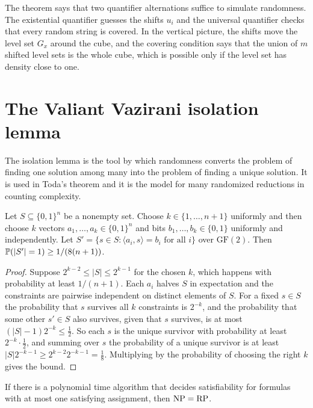 The theorem says that two quantifier alternations suffice to simulate randomness. The existential quantifier guesses the shifts $u_i$ and the universal quantifier checks that every random string is covered. In the vertical picture, the shifts move the level set $G_x$ around the cube, and the covering condition says that the union of $m$ shifted level sets is the whole cube, which is possible only if the level set has density close to one.

\section{The Valiant Vazirani isolation lemma}

The isolation lemma is the tool by which randomness converts the problem of finding one solution among many into the problem of finding a unique solution. It is used in Toda's theorem and it is the model for many randomized reductions in counting complexity.

\begin{lemma}
Let $S \subseteq \{0,1\}^n$ be a nonempty set. Choose $k \in \{1, \dots, n+1\}$ uniformly and then choose $k$ vectors $a_1, \dots, a_k \in \{0,1\}^n$ and bits $b_1, \dots, b_k \in \{0,1\}$ uniformly and independently. Let $S' = \{ s \in S : \langle a_i, s \rangle = b_i \text{ for all } i \}$ over $\mathrm{GF}(2)$. Then $\mathbb{P}( |S'| = 1 ) \ge 1 / (8(n+1))$.
\end{lemma}

\begin{proof}
Suppose $2^{k-2} \le |S| \le 2^{k-1}$ for the chosen $k$, which happens with probability at least $1/(n+1)$. Each $a_i$ halves $S$ in expectation and the constraints are pairwise independent on distinct elements of $S$. For a fixed $s \in S$ the probability that $s$ survives all $k$ constraints is $2^{-k}$, and the probability that some other $s' \in S$ also survives, given that $s$ survives, is at most $(|S| - 1) 2^{-k} \le \tfrac12$. So each $s$ is the unique survivor with probability at least $2^{-k} \cdot \tfrac12$, and summing over $s$ the probability of a unique survivor is at least $|S| 2^{-k-1} \ge 2^{k-2} 2^{-k-1} = \tfrac18$. Multiplying by the probability of choosing the right $k$ gives the bound.
\end{proof}

\begin{theorem}
If there is a polynomial time algorithm that decides satisfiability for formulas with at most one satisfying assignment, then $\mathrm{NP} = \mathrm{RP}$.
\end{theorem}

